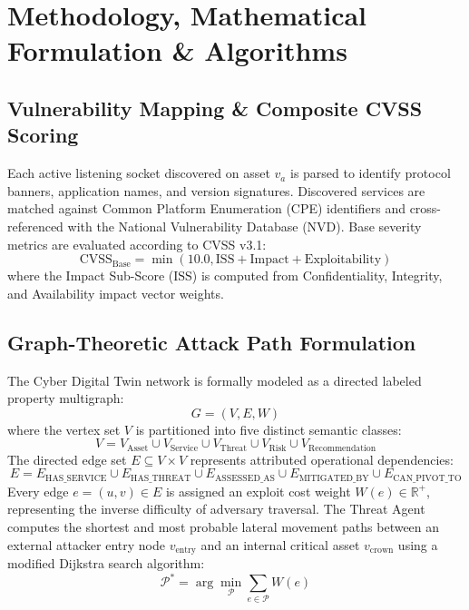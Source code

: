 \documentclass[conference]{IEEEtran}
\begin{document}
\section{Methodology, Mathematical Formulation \& Algorithms}

\subsection{Vulnerability Mapping \& Composite CVSS Scoring}
Each active listening socket discovered on asset $v_a$ is parsed to identify protocol banners, application names, and version signatures. Discovered services are matched against Common Platform Enumeration (CPE) identifiers and cross-referenced with the National Vulnerability Database (NVD). Base severity metrics are evaluated according to CVSS v3.1:
\begin{equation}
\text{CVSS}_{\text{Base}} = \min\left(10.0, \text{ISS} + \text{Impact} + \text{Exploitability}\right)
\end{equation}
where the Impact Sub-Score ($\text{ISS}$) is computed from Confidentiality, Integrity, and Availability impact vector weights.

\subsection{Graph-Theoretic Attack Path Formulation}
The Cyber Digital Twin network is formally modeled as a directed labeled property multigraph:
\begin{equation}
G = (V, E, W)
\end{equation}
where the vertex set $V$ is partitioned into five distinct semantic classes:
\begin{equation}
V = V_{\text{Asset}} \cup V_{\text{Service}} \cup V_{\text{Threat}} \cup V_{\text{Risk}} \cup V_{\text{Recommendation}}
\end{equation}
The directed edge set $E \subseteq V \times V$ represents attributed operational dependencies:
\begin{equation}
E = E_{\text{HAS\_SERVICE}} \cup E_{\text{HAS\_THREAT}} \cup E_{\text{ASSESSED\_AS}} \cup E_{\text{MITIGATED\_BY}} \cup E_{\text{CAN\_PIVOT\_TO}}
\end{equation}
Every edge $e = (u, v) \in E$ is assigned an exploit cost weight $W(e) \in \mathbb{R}^+$, representing the inverse difficulty of adversary traversal. The Threat Agent computes the shortest and most probable lateral movement paths between an external attacker entry node $v_{\text{entry}}$ and an internal critical asset $v_{\text{crown}}$ using a modified Dijkstra search algorithm:
\begin{equation}
\mathcal{P}^* = \arg\min_{\mathcal{P}} \sum_{e \in \mathcal{P}} W(e)
\end{equation}
\end{document}
